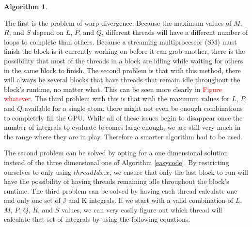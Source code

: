 \documentclass[12pt]{report}
\newcommand{\notetodylan}[1]{\textcolor{red}{#1}} %
\newtheorem{algorithm}[theorem]{Algorithm}
\begin{document}
\begin{algorithm}
\caption{Easy Code}
\label{easycode}
\begin{algorithmic}

\STATE{}
				\ELSE
				\ENDIF
					\ELSE
					\ENDIF
					\ENDFOR
				\ENDFOR
			\ENDFOR
\ENDIF
\end{algorithmic}
\end{algorithm}

The first is the problem of warp divergence. Because the maximum values of $M$, $R$, and $S$ depend on $L$, $P$, and $Q$, different threads will have a different number of loops to complete than others. Because a streaming multiprocessor (SM) must finish the block is it currently working on before it can grab another, there is the possibility that most of the threads in a block are idling while waiting for others in the same block to finish. The second problem is that with this method, there will always be several blocks that have threads that remain idle throughout the block's runtime, no matter what. This can be seen more clearly in \notetodylan{Figure whatever}. The third problem with this is that with the maximum values for $L$, $P$, and $Q$ available for a single atom, there might not even be enough combinations to completely fill the GPU. While all of these issues begin to disappear once the number of integrals to evaluate becomes large enough, we are still very much in the range where they are in play. Therefore a smarter algorithm had to be used.

The second problem can be solved by opting for a one dimensional solution instead of the three dimensional one of Algorithm \ref{easycode}. By restricting ourselves to only using $threadIdx.x$, we ensure that only the last block to run will have the possibility of having threads remaining idle throughout the block's runtime. The third problem can be solved by having each thread calculate one and only one set of J and K integrals. If we start with a valid combination of $L$, $M$, $P$, $Q$, $R$, and $S$ values, we can very easily figure out which thread will calculate that set of integrals by using the following equations.
\end{document}

